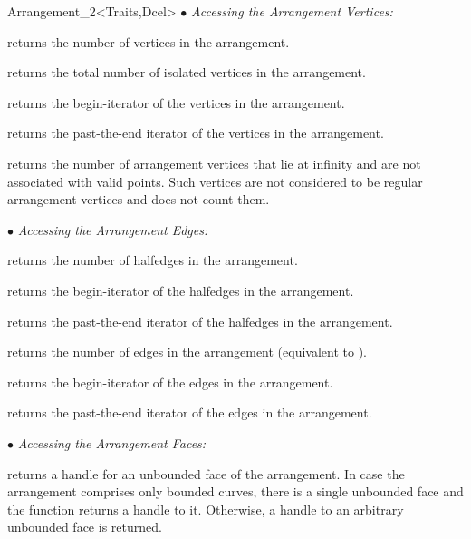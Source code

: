 \begin{ccRefClass}{Arrangement_2<Traits,Dcel>}
$\bullet$ {\sl Accessing the Arrangement Vertices:}

    {returns the number of vertices in the arrangement.}

    {returns the total number of isolated vertices in the arrangement.}

    {returns the begin-iterator of the vertices in the arrangement.}
    
    {returns the past-the-end iterator of the vertices in the arrangement.}

    {returns the number of arrangement vertices that lie at infinity and
     are not associated with valid points. Such vertices are not considered
     to be regular arrangement vertices and \ccVar{}
     does not count them.}

$\bullet$ {\sl Accessing the Arrangement Edges:}

    {returns the number of halfedges in the arrangement.}

    {returns the begin-iterator of the halfedges in the arrangement.}
 
    {returns the past-the-end iterator of the halfedges in the arrangement.}

    {returns the number of edges in the arrangement (equivalent to
     ).}

    {returns the begin-iterator of the edges in the arrangement.}
 
    {returns the past-the-end iterator of the edges in the arrangement.}

$\bullet$ {\sl Accessing the Arrangement Faces:}

    {returns a handle for an unbounded face of the arrangement.
     In case the arrangement comprises only bounded curves, there is a single
     unbounded face and the function returns a handle to it. Otherwise, a
     handle to an arbitrary unbounded face is returned.}


\end{ccRefClass}
